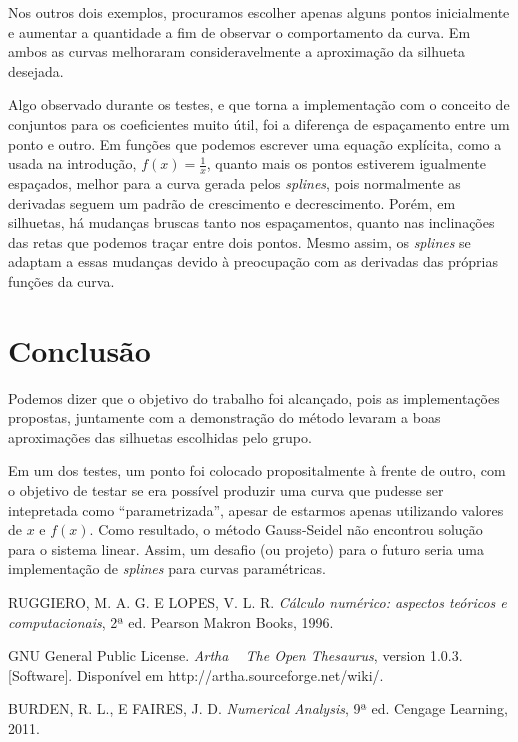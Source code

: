\documentclass[11pt]{article}
\begin{document}
Nos outros dois exemplos, procuramos escolher apenas alguns pontos inicialmente
e aumentar a quantidade a fim de observar o comportamento da curva. Em ambos
as curvas melhoraram consideravelmente a aproximação da silhueta desejada.

Algo observado durante os testes, e que torna a implementação com o conceito
de conjuntos para os coeficientes muito útil, foi a diferença de espaçamento entre um
ponto e outro. Em funções que podemos escrever uma equação explícita, como
a usada na introdução, $f(x) = \frac{1}{x}$, quanto mais os pontos estiverem
igualmente espaçados, melhor para a curva gerada pelos \textit{splines}, pois
normalmente as derivadas seguem um padrão de crescimento e decrescimento.
Porém, em silhuetas, há mudanças bruscas tanto nos espaçamentos, quanto
nas inclinações das retas que podemos traçar entre dois pontos. Mesmo assim,
os \textit{splines} se adaptam a essas mudanças devido à preocupação
com as derivadas das próprias funções da curva.

\section{Conclusão}

Podemos dizer que o objetivo do trabalho foi alcançado, pois as implementações
propostas, juntamente com a demonstração do método levaram a boas
aproximações das silhuetas escolhidas pelo grupo.

Em um dos testes, um ponto foi colocado propositalmente à frente de outro,
com o objetivo de testar se era possível produzir uma curva que pudesse
ser intepretada como ``parametrizada'', apesar de estarmos apenas utilizando
valores de $x$ e $f(x)$. Como resultado, o método Gauss-Seidel não encontrou
solução para o sistema linear. Assim, um desafio (ou projeto) para o futuro
seria uma implementação de \textit{splines} para curvas paramétricas.

\begin{thebibliography}{9}

RUGGIERO, M. A. G. E LOPES, V. L. R.
\textit{Cálculo numérico: aspectos teóricos e computacionais}, 2ª ed.
Pearson Makron Books, 1996.

GNU General Public License.
\textit{Artha ~ The Open Thesaurus}, version 1.0.3.
[Software]. Disponível em http://artha.sourceforge.net/wiki/.

BURDEN, R. L., E FAIRES, J. D.
\textit{Numerical Analysis}, 9ª ed.
Cengage Learning, 2011.

\end{thebibliography}
\end{document}
